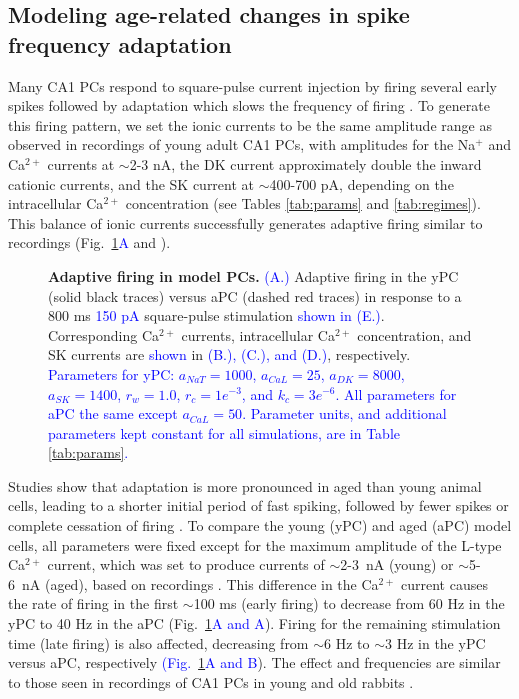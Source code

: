 \documentclass[10pt,letterpaper]{article}
\newcommand{\Ca}{Ca$^{2+}$}
\newcommand{\Na}{Na$^{+}$}
\newcommand{\edit}[1]{\textcolor{blue}{#1}}
\begin{document}
\subsection*{Modeling age-related changes in spike frequency adaptation}
Many CA1 PCs respond to square-pulse current injection by firing several early spikes followed by adaptation which slows the frequency of firing \cite{gant2006early,gu2008sk,moyer1992nimodipine}. To generate this firing pattern, we set the ionic currents to be the same amplitude range as observed in recordings of young adult CA1 PCs, with amplitudes for the {\Na} and {\Ca} currents at $\sim$2-3 nA, the DK current approximately double the inward cationic currents, and the SK current at $\sim$400-700 pA, depending on the intracellular {\Ca} concentration (see Tables \ref{tab:params} and \ref{tab:regimes}). This balance of ionic currents successfully generates adaptive firing similar to recordings (Fig.~\ref{fig:adapt}\edit{A} and \edit{}).

\begin{figure}[h!]
\centering
\caption{{\bf Adaptive firing in model PCs.}
\edit{(A.)} Adaptive firing in the yPC (solid black traces) versus aPC (dashed red traces) in response to a 800 ms \edit{150 pA} square-pulse stimulation \edit{shown in (E.)}. Corresponding {\Ca} currents, intracellular {\Ca} concentration, and SK currents are \edit{shown} in \edit{(B.), (C.), and (D.)}, respectively. \edit{Parameters for yPC: $a_{NaT}=1000$, $a_{CaL}=25$, $a_{DK}=8000$, $a_{SK}=1400$, $r_{w}=1.0$, $r_{c}=1e^{-3}$, and $k_{c}=3e^{-6}$. All parameters for aPC the same except $a_{CaL}=50$. Parameter units, and additional parameters kept constant for all simulations, are in Table \ref{tab:params}.}}
\label{fig:adapt}
\end{figure}

Studies show that adaptation is more pronounced in aged than young animal cells, leading to a shorter initial period of fast spiking, followed by fewer spikes or complete cessation of firing \cite{disterhoft1996calcium,gant2006early,moyer1992nimodipine,tombaugh2005slow}. To compare the young (yPC) and aged (aPC) model cells, all parameters were fixed except for the maximum amplitude of the L-type {\Ca} current, which was set to produce currents of $\sim$2-3~nA (young) or $\sim$5-6~nA (aged), based on recordings \cite{campbell1996aging}. This difference in the {\Ca} current causes the rate of firing in the first $\sim$100 ms (early firing) to decrease from 60 Hz in the yPC to 40 Hz in the aPC (Fig.~\ref{fig:adapt}\edit{A and A}). Firing for the remaining stimulation time (late firing) is also affected, decreasing from $\sim$6 Hz to $\sim$3 Hz in the yPC versus aPC, respectively \edit{(Fig.~\ref{fig:adapt}A and B}). The effect and frequencies are similar to those seen in recordings of CA1 PCs in young and old rabbits \cite{moyer1992nimodipine}.
\end{document}
